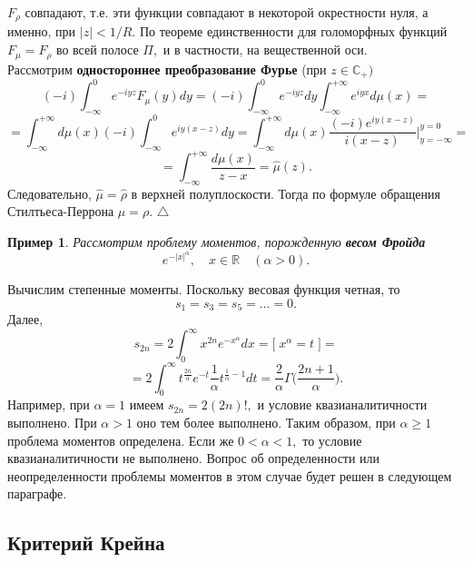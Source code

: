 \documentclass[12pt,a4paper]{article}
\theoremstyle{plain}   \newtheorem{Pro}{Задача}
\newtheorem{Exa}{Пример}
\begin{document}
$ F_{\rho} $
совпадают, т.е. эти функции совпадают в некоторой окрестности нуля,
а именно, при
$ |z|<1/R . $
По теореме единственности для голоморфных функций
$ F_{\mu}=F_{\rho} $
во всей полосе
$ \Pi , $
и в частности, на вещественной оси.
\\
Рассмотрим
{\bfseries одностороннее преобразование Фурье}
(при
$ z \in \mathbb{C}_+ ) $
$$
  (-i)\int _{-\infty}^0 e^{-iyz}F_{\mu}(y)dy=
  (-i)\int _{-\infty}^0 e^{-iyz}dy
  \int _{-\infty}^{+\infty} e^{iyx}d\mu (x)=
$$
$$
  =\int _{-\infty}^{+\infty} d\mu (x)
  (-i)\int _{-\infty}^0 e^{iy(x-z)}dy=
  \int _{-\infty}^{+\infty} d\mu (x)
  \frac{(-i)e^{iy(x-z)}}{i(x-z)} \Bigg | _{y=-\infty}^{y=0}=
$$
$$
  =\int _{-\infty}^{+\infty} \frac{d\mu (x)}{z-x}=
  \hat \mu (z).
$$
Следовательно,
$ \hat \mu = \hat \rho $
в верхней полуплоскости. Тогда по формуле обращения
Стилтьеса-Перрона
$ \mu = \rho . $
$ \triangle $
\begin{Exa}
Рассмотрим проблему моментов, порожденную
{\bfseries весом Фройда}
$$
  e^{-|x|^{\alpha}}, \quad x \in \mathbb{R} \quad (\alpha >0).
$$
\end{Exa}
Вычислим степенные моменты. Поскольку весовая функция четная, то
$$
  s_1 =s_3 =s_5 =...=0.
$$
Далее,
$$
  s_{2n}=2 \int _0 ^{\infty} x^{2n} e^{-x^{\alpha}}dx=
  \bigl [ \; x^{\alpha}=t \; \bigr ] =
$$
$$
  =2 \int _0 ^{\infty} t^{\frac{2n}{\alpha}}e^{-t}
  \frac{1}{\alpha} t^{\frac{1}{\alpha}-1}dt=
  \frac{2}{\alpha} \Gamma \biggl (
  \frac{2n+1}{\alpha} \biggr ) .
$$
Например, при
$ \alpha =1 $
имеем
$ s_{2n}=2(2n)! , $
и условие квазианалитичности выполнено. При
$ \alpha >1 $
оно тем более выполнено. Таким образом, при
$ \alpha \geq 1 $
проблема моментов определена. Если же
$ 0<\alpha <1 , $
то условие квазианалитичности не выполнено. Вопрос об
определенности или неопределенности проблемы моментов
в этом случае будет решен в следующем параграфе.
\newpage
\subsection{Критерий Крейна}
$ \; $
\\
\end{document}
